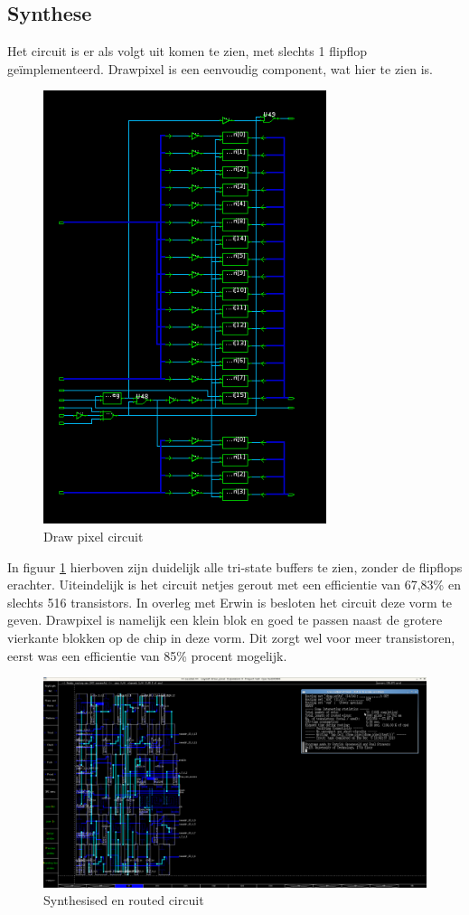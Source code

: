 \documentclass{scrreprt} %
\begin{document}
\subsection{Synthese}
Het circuit is er als volgt uit komen te zien, met slechts 1 flipflop geïmplementeerd. Drawpixel is een eenvoudig component, wat hier te zien is. 
\begin{figure} [h!]
\centering
\includegraphics [scale = 0.8] {resource/dp_circ}
\caption{Draw pixel circuit}
\label{fig:dpcircuit}
\end{figure}

\newpage 

In figuur \ref{fig:dpcircuit} hierboven zijn duidelijk alle tri-state buffers te zien, zonder de flipflops erachter. Uiteindelijk is het circuit netjes gerout met een efficientie van 67,83\% en slechts 516 transistors. In overleg met Erwin is besloten het circuit deze vorm te geven. Drawpixel is namelijk een klein blok en goed te passen naast de grotere vierkante blokken op de chip in deze vorm. Dit zorgt wel voor meer transistoren, eerst was een efficientie van 85\% procent mogelijk. 
\begin{figure} [h!]
\includegraphics [width = \textwidth] {resource/dp_trout}
\caption{Synthesised en routed circuit}
\label{fig:dplayout}
\end{figure}
\end{document}
